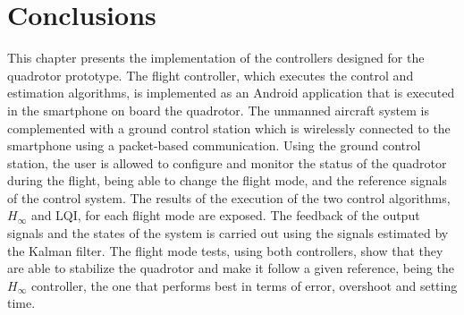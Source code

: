 \section{Conclusions}
This chapter presents the implementation of the controllers designed for the quadrotor prototype. The flight controller, which executes the control and estimation algorithms, is implemented as an Android application that is executed in the smartphone on board the quadrotor. The unmanned aircraft system is complemented with a ground control station which is wirelessly connected to the smartphone using a packet-based communication. Using the ground control station, the user is allowed to configure and monitor the status of the quadrotor during the flight, being able to change the flight mode, and the reference signals of the control system. The results of the execution of the two control algorithms, $H_\infty$ and LQI, for each flight mode are exposed. The feedback of the output signals and the states of the system is carried out using the signals estimated by the Kalman filter. The flight mode tests, using both controllers, show that they are able to stabilize the quadrotor and make it follow a given reference, being the $H_\infty$ controller, the one that performs best in terms of error, overshoot and setting time.
